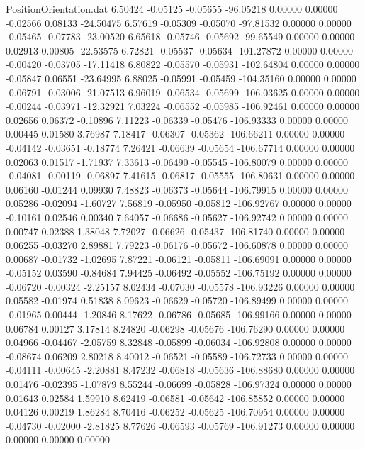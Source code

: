 \begin{filecontents}{PositionOrientation.dat}
   6.50424   -0.05125   -0.05655   -96.05218    0.00000    0.00000   -0.02566    0.08133  -24.50475
   6.57619   -0.05309   -0.05070   -97.81532    0.00000    0.00000   -0.05465   -0.07783  -23.00520
   6.65618   -0.05746   -0.05692   -99.65549    0.00000    0.00000    0.02913    0.00805  -22.53575
   6.72821   -0.05537   -0.05634  -101.27872    0.00000    0.00000   -0.00420   -0.03705  -17.11418
   6.80822   -0.05570   -0.05931  -102.64804    0.00000    0.00000   -0.05847    0.06551  -23.64995
   6.88025   -0.05991   -0.05459  -104.35160    0.00000    0.00000   -0.06791   -0.03006  -21.07513
   6.96019   -0.06534   -0.05699  -106.03625    0.00000    0.00000   -0.00244   -0.03971  -12.32921
   7.03224   -0.06552   -0.05985  -106.92461    0.00000    0.00000    0.02656    0.06372   -0.10896
   7.11223   -0.06339   -0.05476  -106.93333    0.00000    0.00000    0.00445    0.01580    3.76987
   7.18417   -0.06307   -0.05362  -106.66211    0.00000    0.00000   -0.04142   -0.03651   -0.18774
   7.26421   -0.06639   -0.05654  -106.67714    0.00000    0.00000    0.02063    0.01517   -1.71937
   7.33613   -0.06490   -0.05545  -106.80079    0.00000    0.00000   -0.04081   -0.00119   -0.06897
   7.41615   -0.06817   -0.05555  -106.80631    0.00000    0.00000    0.06160   -0.01244    0.09930
   7.48823   -0.06373   -0.05644  -106.79915    0.00000    0.00000    0.05286   -0.02094   -1.60727
   7.56819   -0.05950   -0.05812  -106.92767    0.00000    0.00000   -0.10161    0.02546    0.00340
   7.64057   -0.06686   -0.05627  -106.92742    0.00000    0.00000    0.00747    0.02388    1.38048
   7.72027   -0.06626   -0.05437  -106.81740    0.00000    0.00000    0.06255   -0.03270    2.89881
   7.79223   -0.06176   -0.05672  -106.60878    0.00000    0.00000    0.00687   -0.01732   -1.02695
   7.87221   -0.06121   -0.05811  -106.69091    0.00000    0.00000   -0.05152    0.03590   -0.84684
   7.94425   -0.06492   -0.05552  -106.75192    0.00000    0.00000   -0.06720   -0.00324   -2.25157
   8.02434   -0.07030   -0.05578  -106.93226    0.00000    0.00000    0.05582   -0.01974    0.51838
   8.09623   -0.06629   -0.05720  -106.89499    0.00000    0.00000   -0.01965    0.00444   -1.20846
   8.17622   -0.06786   -0.05685  -106.99166    0.00000    0.00000    0.06784    0.00127    3.17814
   8.24820   -0.06298   -0.05676  -106.76290    0.00000    0.00000    0.04966   -0.04467   -2.05759
   8.32848   -0.05899   -0.06034  -106.92808    0.00000    0.00000   -0.08674    0.06209    2.80218
   8.40012   -0.06521   -0.05589  -106.72733    0.00000    0.00000   -0.04111   -0.00645   -2.20881
   8.47232   -0.06818   -0.05636  -106.88680    0.00000    0.00000    0.01476   -0.02395   -1.07879
   8.55244   -0.06699   -0.05828  -106.97324    0.00000    0.00000    0.01643    0.02584    1.59910
   8.62419   -0.06581   -0.05642  -106.85852    0.00000    0.00000    0.04126    0.00219    1.86284
   8.70416   -0.06252   -0.05625  -106.70954    0.00000    0.00000   -0.04730   -0.02000   -2.81825
   8.77626   -0.06593   -0.05769  -106.91273    0.00000    0.00000    0.00000    0.00000    0.00000
\end{filecontents}

